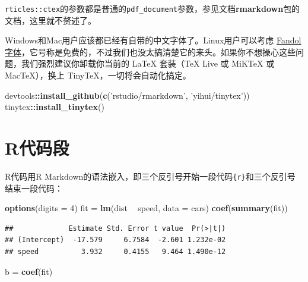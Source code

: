\documentclass[hyperref,]{ctexart}
\newenvironment{Shaded}{\begin{snugshade}}{\end{snugshade}}
\newcommand{\DataTypeTok}[1]{\textcolor[rgb]{0.13,0.29,0.53}{#1}}
\newcommand{\DecValTok}[1]{\textcolor[rgb]{0.00,0.00,0.81}{#1}}
\newcommand{\KeywordTok}[1]{\textcolor[rgb]{0.13,0.29,0.53}{\textbf{#1}}}
\newcommand{\NormalTok}[1]{#1}
\newcommand{\OperatorTok}[1]{\textcolor[rgb]{0.81,0.36,0.00}{\textbf{#1}}}
\newcommand{\StringTok}[1]{\textcolor[rgb]{0.31,0.60,0.02}{#1}}
\begin{document}
\texttt{rticles::ctex}的参数都是普通的\texttt{pdf\_document}参数，参见文档\textbf{rmarkdown}包的文档，这里就不赘述了。

Windows和Mac用户应该都已经有自带的中文字体了。Linux用户可以考虑
\href{http://ctan.org/pkg/fandol}{Fandol字体}，它号称是免费的，不过我们也没太搞清楚它的来头。如果你不想操心这些问题，我们强烈建议你卸载你当前的
LaTeX 套装（TeX Live 或 MiKTeX 或 MacTeX），换上
TinyTeX，一切将会自动化搞定。

\begin{Shaded}
\begin{Highlighting}[]
\NormalTok{devtools}\OperatorTok{::}\KeywordTok{install_github}\NormalTok{(}\KeywordTok{c}\NormalTok{(}\StringTok{'rstudio/rmarkdown'}\NormalTok{, }\StringTok{'yihui/tinytex'}\NormalTok{))}
\NormalTok{tinytex}\OperatorTok{::}\KeywordTok{install_tinytex}\NormalTok{()}
\end{Highlighting}
\end{Shaded}

\hypertarget{rux4ee3ux7801ux6bb5}{%
\section{R代码段}\label{rux4ee3ux7801ux6bb5}}

R代码用R
Markdown的语法嵌入，即三个反引号开始一段代码\texttt{\textasciigrave{}\textasciigrave{}\textasciigrave{}\{r\}}和三个反引号\texttt{\textasciigrave{}\textasciigrave{}\textasciigrave{}}
结束一段代码：

\begin{Shaded}
\begin{Highlighting}[]
\KeywordTok{options}\NormalTok{(}\DataTypeTok{digits =} \DecValTok{4}\NormalTok{)}
\NormalTok{fit =}\StringTok{ }\KeywordTok{lm}\NormalTok{(dist }\OperatorTok{~}\StringTok{ }\NormalTok{speed, }\DataTypeTok{data =}\NormalTok{ cars)}
\KeywordTok{coef}\NormalTok{(}\KeywordTok{summary}\NormalTok{(fit))}
\end{Highlighting}
\end{Shaded}

\begin{verbatim}
##             Estimate Std. Error t value  Pr(>|t|)
## (Intercept)  -17.579     6.7584  -2.601 1.232e-02
## speed          3.932     0.4155   9.464 1.490e-12
\end{verbatim}

\begin{Shaded}
\begin{Highlighting}[]
\NormalTok{b =}\StringTok{ }\KeywordTok{coef}\NormalTok{(fit)}
\end{Highlighting}
\end{Shaded}
\end{document}
